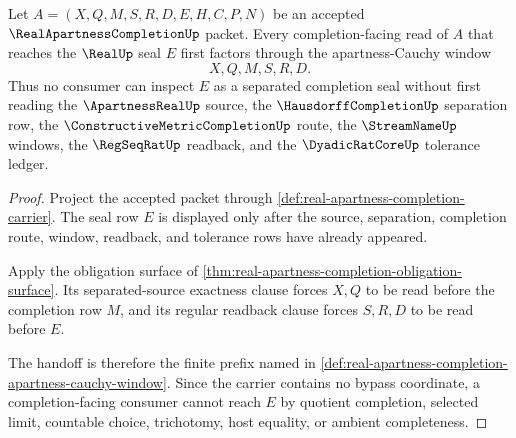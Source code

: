 \begin{theorem}
\label{thm:real-apartness-completion-separated-completion-handoff}
Let $A=(X,Q,M,S,R,D,E,H,C,P,N)$ be an accepted $\RealApartnessCompletionUp$ packet. Every completion-facing read of $A$ that reaches the $\RealUp$ seal $E$ first factors through the apartness-Cauchy window
$$
X,Q,M,S,R,D .
$$
Thus no consumer can inspect $E$ as a separated completion seal without first reading the $\ApartnessRealUp$ source, the $\HausdorffCompletionUp$ separation row, the $\ConstructiveMetricCompletionUp$ route, the $\StreamNameUp$ windows, the $\RegSeqRatUp$ readback, and the $\DyadicRatCoreUp$ tolerance ledger.
\end{theorem}
\begin{proof}
Project the accepted packet through \autoref{def:real-apartness-completion-carrier}. The seal row $E$ is displayed only after the source, separation, completion route, window, readback, and tolerance rows have already appeared.

Apply the obligation surface of \autoref{thm:real-apartness-completion-obligation-surface}. Its separated-source exactness clause forces $X,Q$ to be read before the completion row $M$, and its regular readback clause forces $S,R,D$ to be read before $E$.

The handoff is therefore the finite prefix named in \autoref{def:real-apartness-completion-apartness-cauchy-window}. Since the carrier contains no bypass coordinate, a completion-facing consumer cannot reach $E$ by quotient completion, selected limit, countable choice, trichotomy, host equality, or ambient completeness.
\end{proof}

